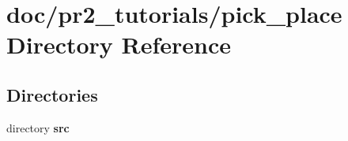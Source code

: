 \section{doc/pr2\-\_\-tutorials/pick\-\_\-place Directory Reference}
\label{dir_2865922e7e06e2f74601983eec1c0d24}
\subsection*{Directories}
\begin{DoxyCompactItemize}
\item 
directory {\bf src}
\end{DoxyCompactItemize}
